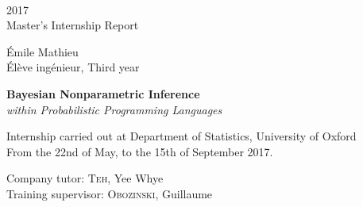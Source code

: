 \documentclass[twoside,10pt,openany,a4paper]{rapport}
\begin{document}
\begin{titlepage}
\begin{center}
      
      \vspace{0.3cm}
      \\
      
      \vspace{0.7cm}
      2017\\
      Master's Internship Report
      
      \vspace{0.3cm}
      Émile Mathieu\\
      Élève ingénieur, Third year
      
      \vspace{2cm}
      \Huge{\textbf{Bayesian Nonparametric Inference}}\\
      \Large{\textit{within Probabilistic Programming Languages}} 

      
      \vfill
      Internship carried out at Department of Statistics, University of Oxford \\
      From the 22nd of May, to the 15th of September 2017.
      
      \vspace{0.3cm}
       Company tutor: \textsc{Teh}, Yee Whye\\
       Training supervisor: \textsc{Obozinski}, Guillaume

      \end{center}
\end{titlepage}

\cleardoublepage

%
\end{document}
